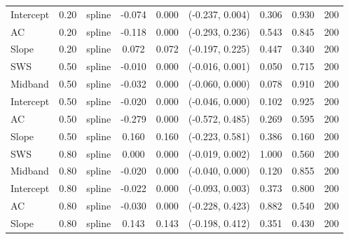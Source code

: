 \begin{table}[!htbp]
\begin{tabular}{lllcccccc}
Intercept & 0.20 & spline & -0.074 & 0.000 & (-0.237, 0.004) & 0.306 & 0.930 & 200 \\
AC & 0.20 & spline & -0.118 & 0.000 & (-0.293, 0.236) & 0.543 & 0.845 & 200 \\
Slope & 0.20 & spline & 0.072 & 0.072 & (-0.197, 0.225) & 0.447 & 0.340 & 200 \\
SWS & 0.50 & spline & -0.010 & 0.000 & (-0.016, 0.001) & 0.050 & 0.715 & 200 \\
Midband & 0.50 & spline & -0.032 & 0.000 & (-0.060, 0.000) & 0.078 & 0.910 & 200 \\
Intercept & 0.50 & spline & -0.020 & 0.000 & (-0.046, 0.000) & 0.102 & 0.925 & 200 \\
AC & 0.50 & spline & -0.279 & 0.000 & (-0.572, 0.485) & 0.269 & 0.595 & 200 \\
Slope & 0.50 & spline & 0.160 & 0.160 & (-0.223, 0.581) & 0.386 & 0.160 & 200 \\
SWS & 0.80 & spline & 0.000 & 0.000 & (-0.019, 0.002) & 1.000 & 0.560 & 200 \\
Midband & 0.80 & spline & -0.020 & 0.000 & (-0.040, 0.000) & 0.120 & 0.855 & 200 \\
Intercept & 0.80 & spline & -0.022 & 0.000 & (-0.093, 0.003) & 0.373 & 0.800 & 200 \\
AC & 0.80 & spline & -0.030 & 0.000 & (-0.228, 0.423) & 0.882 & 0.540 & 200 \\
Slope & 0.80 & spline & 0.143 & 0.143 & (-0.198, 0.412) & 0.351 & 0.430 & 200 \\
\bottomrule
\end{tabular}
\end{table}
